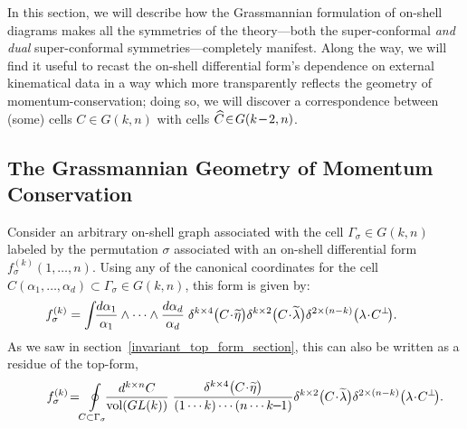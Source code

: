 \documentclass[12pt,hyperref,compress]{JHEP3}
\renewcommand{\hat}{\widehat}
\newcommand{\eq}[1]{\begin{equation}#1\end{equation}}
\newcommand{\mi}{{\rm\rule[2.4pt]{6pt}{0.65pt}}}
\begin{document}
{In this section, we will describe how the Grassmannian formulation of on-shell diagrams makes all the symmetries of the theory---both the super-conformal {\it and} {\it dual} super-conformal symmetries---completely manifest. Along the way, we will find it useful to recast the on-shell differential form's dependence on external kinematical data in a way which more transparently reflects the geometry of momentum-conservation; doing so, we will discover a correspondence between (some) cells $C\!\in\!G(k,n)$ with cells \mbox{$\hat{C}\!\in\!G(k\,\mi\,2,n)$}.







\subsection{The Grassmannian Geometry of Momentum Conservation}\label{grassmannian_geometry_of_momentum_conservation_subsection}

Consider an arbitrary on-shell graph associated with the cell $\Gamma_\sigma\!\in\!G(k,n)$ labeled by the permutation $\sigma$ associated with an on-shell differential form $f^{(k)}_\sigma(1,\ldots,n)$. Using any of the canonical coordinates for the cell $C(\alpha_1,\ldots,\alpha_d)\subset\Gamma_\sigma\!\in\!G(k,n)$, this form is given by:
\vspace{-.2cm}\eq{\hspace{-.75cm}f_\sigma^{(k)}=\int\!\!\frac{d\alpha_1}{\alpha_1}\wedge\cdots\wedge\frac{d\alpha_d}{\alpha_d}\;\delta^{k\times4}\big(C\!\cdot\!\widetilde{\eta}\big)\delta^{k\times2}\big(C\!\cdot\!\widetilde{\lambda}\big)\delta^{2\times(n-k)}\big(\lambda\!\cdot\!C^\perp\!\big).\vspace{-.2cm}\label{general_on_shell_function_canonical_coordinates}}
As we saw in \mbox{section \ref{invariant_top_form_section}}, this can also be written as a residue of the top-form,
\vspace{-.2cm}\eq{\hspace{-0.75cm}f_\sigma^{(k)}\!=\!\oint\limits_{C\subset\Gamma_\sigma}\!\!\!\frac{d^{k \times n} C}{\mathrm{vol}(GL(k))}\;\frac{\delta^{k\times4}\big(C\!\cdot\!\widetilde{\eta}\big)}{(1\cdots k)\cdots(n\cdots k\mi1)}\delta^{k\times2}\big(C\!\cdot\!\widetilde{\lambda}\big)\delta^{2\times(n-k)}\big(\lambda\!\cdot\!C^\perp\!\big).\hspace{-1.3cm}\vspace{-.2cm}\label{general_on_shell_function}}

}
\end{document}
